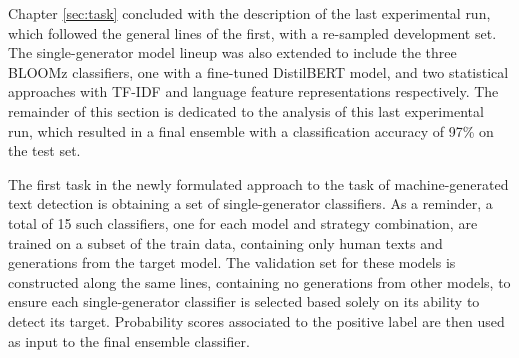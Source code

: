 Chapter \ref{sec:task} concluded with the description of the last experimental run, which followed the general lines of the first, with a re-sampled development set.
The single-generator model lineup was also extended to include the three BLOOMz classifiers, one with a fine-tuned DistilBERT model, and two statistical approaches with TF-IDF and language feature representations respectively.
The remainder of this section is dedicated to the analysis of this last experimental run, which resulted in a final ensemble with a classification accuracy of 97\% on the test set.

The first task in the newly formulated approach to the task of machine-generated text detection is obtaining a set of single-generator classifiers.
As a reminder, a total of 15 such classifiers, one for each model and strategy combination, are trained on a subset of the train data, containing only human texts and generations from the target model.
The validation set for these models is constructed along the same lines, containing no generations from other models, to ensure each single-generator classifier is selected based solely on its ability to detect its target.
Probability scores associated to the positive label are then used as input to the final ensemble classifier.


